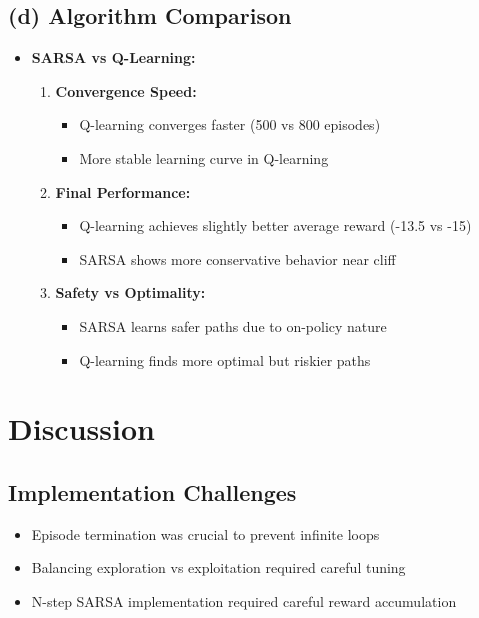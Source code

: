 \documentclass{article}
\begin{document}
\subsection*{(d) Algorithm Comparison}
\begin{itemize}
    \item \textbf{SARSA vs Q-Learning:}
    \begin{enumerate}
        \item \textbf{Convergence Speed:}
        \begin{itemize}
            \item Q-learning converges faster (500 vs 800 episodes)
            \item More stable learning curve in Q-learning
        \end{itemize}
        
        \item \textbf{Final Performance:}
        \begin{itemize}
            \item Q-learning achieves slightly better average reward (-13.5 vs -15)
            \item SARSA shows more conservative behavior near cliff
        \end{itemize}
        
        \item \textbf{Safety vs Optimality:}
        \begin{itemize}
            \item SARSA learns safer paths due to on-policy nature
            \item Q-learning finds more optimal but riskier paths
        \end{itemize}
    \end{enumerate}
\end{itemize}

\section{Discussion}

\subsection*{Implementation Challenges}
\begin{itemize}
    \item Episode termination was crucial to prevent infinite loops
    \item Balancing exploration vs exploitation required careful tuning
    \item N-step SARSA implementation required careful reward accumulation
\end{itemize}
\end{document}
